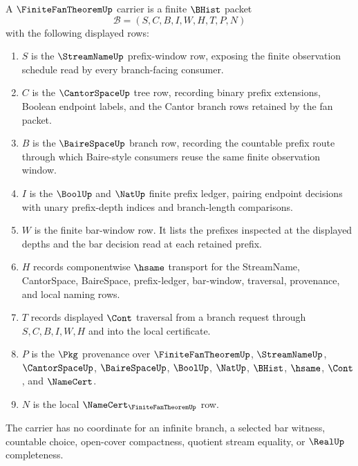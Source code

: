 \begin{definition}
\label{def:finite-fan-theorem-carrier}
A $\FiniteFanTheoremUp$ carrier is a finite $\BHist$ packet
$$
\mathcal{B}=(S,C,B,I,W,H,T,P,N)
$$
with the following displayed rows:
\begin{enumerate}
\item $S$ is the $\StreamNameUp$ prefix-window row, exposing the finite observation schedule read by every branch-facing consumer.
\item $C$ is the $\CantorSpaceUp$ tree row, recording binary prefix extensions, Boolean endpoint labels, and the Cantor branch rows retained by the fan packet.
\item $B$ is the $\BaireSpaceUp$ branch row, recording the countable prefix route through which Baire-style consumers reuse the same finite observation window.
\item $I$ is the $\BoolUp$ and $\NatUp$ finite prefix ledger, pairing endpoint decisions with unary prefix-depth indices and branch-length comparisons.
\item $W$ is the finite bar-window row. It lists the prefixes inspected at the displayed depths and the bar decision read at each retained prefix.
\item $H$ records componentwise $\hsame$ transport for the StreamName, CantorSpace, BaireSpace, prefix-ledger, bar-window, traversal, provenance, and local naming rows.
\item $T$ records displayed $\Cont$ traversal from a branch request through $S,C,B,I,W,H$ and into the local certificate.
\item $P$ is the $\Pkg$ provenance over $\FiniteFanTheoremUp$, $\StreamNameUp$, $\CantorSpaceUp$, $\BaireSpaceUp$, $\BoolUp$, $\NatUp$, $\BHist$, $\hsame$, $\Cont$, and $\NameCert$.
\item $N$ is the local $\NameCert_{\FiniteFanTheoremUp}$ row.
\end{enumerate}
The carrier has no coordinate for an infinite branch, a selected bar witness, countable choice, open-cover compactness, quotient stream equality, or $\RealUp$ completeness.
\end{definition}

